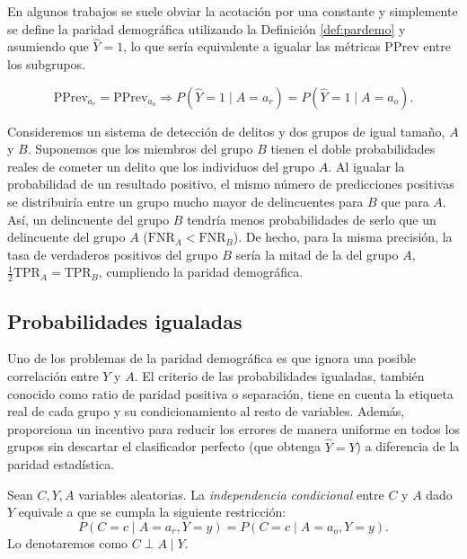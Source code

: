 \documentclass[oneside,openright,titlepage,numbers=noenddot,openany,headinclude,footinclude=true,
cleardoublepage=empty,abstractoff,BCOR=5mm,paper=a4,fontsize=12pt,main=spanish]{scrreprt}
\begin{document}
En algunos trabajos se suele obviar la acotación por una constante y simplemente se define la paridad demográfica utilizando la Definición \ref{def:pardemo} y asumiendo que $\hat{Y}=1$, lo que sería equivalente a igualar las métricas PPrev entre los subgrupos.

\begin{equation*}
\text{PPrev}_{a_r}=\text{PPrev}_{a_o} \Rightarrow P(\hat{Y}=1 \mid A=a_r)=P(\hat{Y}=1 \mid A=a_o).
\end{equation*}

\begin{example}
Consideremos un sistema de detección de delitos y dos grupos de igual tamaño, $A$ y $B$. Suponemos que los miembros del grupo $B$ tienen el doble probabilidades reales de cometer un delito que los individuos del grupo $A$. Al igualar la probabilidad de un resultado positivo, el mismo número de predicciones positivas se distribuiría entre un grupo mucho mayor de delincuentes para $B$ que para $A$. Así, un delincuente del grupo $B$ tendría menos probabilidades de serlo que un delincuente del grupo $A$ ($\text{FNR}_A < \text{FNR}_B$). De hecho, para la misma precisión, la tasa de verdaderos positivos del grupo $B$ sería la mitad de la del grupo $A$, $\frac{1}{2} \text{TPR}_A = \text{TPR}_B$, cumpliendo la paridad demográfica.
\end{example}

\subsection{Probabilidades igualadas}

Uno de los problemas de la paridad demográfica es que ignora una posible correlación entre $Y$ y $A$. El criterio de las probabilidades igualadas, también conocido como ratio de paridad positiva o separación, tiene en cuenta la etiqueta real de cada grupo y su condicionamiento al resto de variables. Además, proporciona un incentivo para reducir los errores de manera uniforme en todos los grupos sin descartar el clasificador perfecto (que obtenga $\hat{Y}=Y$) a diferencia de la paridad estadística.\\

\begin{definition}
Sean $C,Y,A$ variables aleatorias. La \textit{independencia condicional} entre $C$ y $A$ dado $Y$ equivale a que se cumpla la siguiente restricción:
$$P(C=c \mid A=a_r, Y=y)=P(C=c \mid A=a_o,Y=y).$$
Lo denotaremos como $C \perp A \mid Y.$
\end{definition}\
\end{document}
